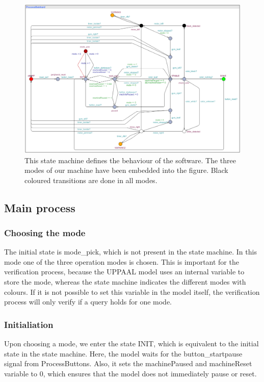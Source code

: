 \documentclass[a4paper,oneside,11pt]{article}
\begin{document}
\begin{figure}[H]
	\centering
	\includegraphics[width=150mm]{mainprocess}
	\caption{This state machine defines the behaviour of the software. The three modes of our machine have been embedded into the figure. Black coloured transitions are done in all modes.}
\end{figure}

\subsection{Main process}
\subsubsection{Choosing the mode}
The initial state is mode\_pick, which is not present in the state machine. In this mode one of the three operation modes is chosen. This is important for the verification process, because the UPPAAL model uses an internal variable to store the mode, whereas the state machine indicates the different modes with colours. If it is not possible to set this variable in the model itself, the verification process will only verify if a query holds for one mode.

\subsubsection{Initialiation}
Upon choosing a mode, we enter the state INIT, which is equivalent to the initial state in the state machine. Here, the model waits for the button\_startpause signal from ProcessButtons. Also, it sets the machinePaused and machineReset variable to 0, which ensures that the model does not immediately pause or reset.
\end{document}
